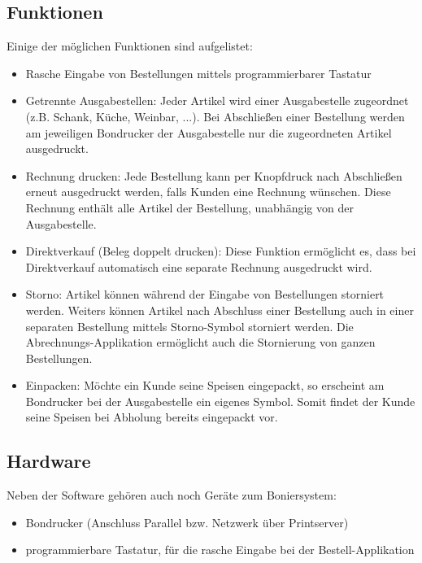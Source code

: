 \documentclass[
10pt, %
a4paper, %
oneside, %
headinclude,footinclude, %
BCOR5mm, %
]{scrartcl}
\theoremstyle{definition} %
\theoremstyle{plain} %
\theoremstyle{remark} %
\begin{document}
\subsection{Funktionen}
Einige der möglichen Funktionen sind aufgelistet:
\begin{itemize}
	\item Rasche Eingabe von Bestellungen mittels programmierbarer Tastatur
	\item Getrennte Ausgabestellen: Jeder Artikel wird einer Ausgabestelle zugeordnet (z.B. Schank, Küche, Weinbar, ...). Bei Abschließen einer Bestellung werden am jeweiligen Bondrucker der Ausgabestelle nur die zugeordneten Artikel ausgedruckt.
	\item Rechnung drucken: Jede Bestellung kann per Knopfdruck nach Abschließen erneut ausgedruckt werden, falls Kunden eine Rechnung wünschen. Diese Rechnung enthält alle Artikel der Bestellung, unabhängig von der Ausgabestelle.
	\item Direktverkauf (Beleg doppelt drucken): Diese Funktion ermöglicht es, dass bei Direktverkauf automatisch eine separate Rechnung ausgedruckt wird.
	\item Storno: Artikel können während der Eingabe von Bestellungen storniert werden. Weiters können Artikel nach Abschluss einer Bestellung auch in einer separaten Bestellung mittels Storno-Symbol storniert werden. Die Abrechnungs-Applikation ermöglicht auch die Stornierung von ganzen Bestellungen.
	\item Einpacken: Möchte ein Kunde seine Speisen eingepackt, so erscheint am Bondrucker bei der Ausgabestelle ein eigenes Symbol. Somit findet der Kunde seine Speisen bei Abholung bereits eingepackt vor.
\end{itemize}


\subsection{Hardware}
Neben der Software gehören auch noch Geräte zum Boniersystem:
\begin{itemize}
	\item Bondrucker (Anschluss Parallel bzw. Netzwerk über Printserver)
	\item programmierbare Tastatur, für die rasche Eingabe bei der Bestell-Applikation
\end{itemize}
\end{document}
